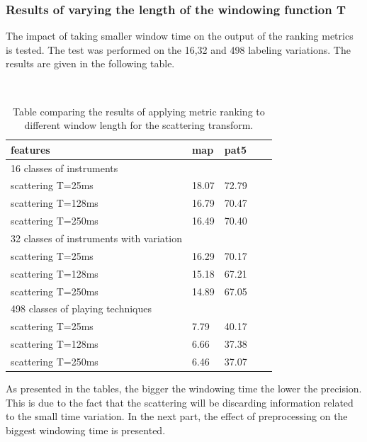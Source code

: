 \documentclass[hidelinks,12pt]{report}
\begin{document}
\subsubsection{Results of varying the length of the windowing function T}
The impact of taking smaller window time on the output of the ranking metrics is tested. The test was performed on the 16,32 and 498 labeling variations. The results are given in the following table.
\begin{table} [H]
\begin{center} 
\ 
 \setlength{\tabcolsep}{.16667em} 
\begin{tabular}{ | l | l | l | l | l |}

features  & map & pat5  \\ 
\hline 
\hline
16 classes of instruments\\
\hline
scattering T=25ms & 18.07 & 72.79  \\ 
 
scattering T=128ms  & 16.79 & 70.47  \\ 

scattering T=250ms  & 16.49 & 70.40  \\ \hline
32 classes of instruments with variation\\
\hline
scattering T=25ms  & 16.29 & 70.17  \\ 

scattering T=128ms  & 15.18 & 67.21  \\ 

scattering T=250ms  & 14.89 & 67.05  \\ \hline
498 classes of playing techniques \\
\hline
scattering T=25ms   &  7.79 & 40.17  \\ 

scattering T=128ms  &  6.66 & 37.38 \\ 

scattering T=250ms  &  6.46 & 37.07 \\ 

\end{tabular} 
\end{center} 
\caption{Table comparing the results of applying metric ranking to different window length for the scattering transform.} 
\label{you} 
\end{table}

As presented in the tables, the bigger the windowing time the lower the precision. This is due to the fact that the scattering will be discarding information related to the small time variation. In the next part, the effect of preprocessing on the biggest windowing time is presented.
\end{document}
